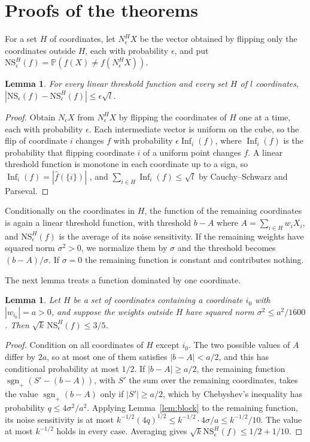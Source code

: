 \documentclass[11pt]{amsart}
\newtheorem{lemma}[theorem]{Lemma}
\theoremstyle{remark}
\numberwithin{equation}{section}
\newcommand{\PP}{\mathbb{P}}
\newcommand{\sgnp}{\operatorname{sgn}_+}
\newcommand{\Inf}{\operatorname{Inf}}
\begin{document}
\section{Proofs of the theorems}\label{sec:proofs}

For a set $H$ of coordinates, let $N^H_\epsilon X$ be the vector obtained by flipping only the coordinates outside $H$, each with probability $\epsilon$, and put $\mathrm{NS}^H_\epsilon(f)=\PP(f(X)\ne f(N^H_\epsilon X))$.

\begin{lemma}\label{lem:freeze}
For every linear threshold function and every set $H$ of $l$ coordinates, $|\mathrm{NS}_\epsilon(f)-\mathrm{NS}^H_\epsilon(f)|\le\epsilon\sqrt l$.
\end{lemma}

\begin{proof}
Obtain $N_\epsilon X$ from $N^H_\epsilon X$ by flipping the coordinates of $H$ one at a time, each with probability $\epsilon$. Each intermediate vector is uniform on the cube, so the flip of coordinate $i$ changes $f$ with probability $\epsilon\Inf_i(f)$, where $\Inf_i(f)$ is the probability that flipping coordinate $i$ of a uniform point changes $f$. A linear threshold function is monotone in each coordinate up to a sign, so $\Inf_i(f)=|\hat f(\{i\})|$ \cite[Chapter~2]{OD14}, and $\sum_{i\in H}\Inf_i(f)\le\sqrt l$ by Cauchy--Schwarz and Parseval.
\end{proof}

Conditionally on the coordinates in $H$, the function of the remaining coordinates is again a linear threshold function, with threshold $b-A$ where $A=\sum_{i\in H}w_iX_i$, and $\mathrm{NS}^H_\epsilon(f)$ is the average of its noise sensitivity. If the remaining weights have squared norm $\sigma^2>0$, we normalize them by $\sigma$ and the threshold becomes $(b-A)/\sigma$. If $\sigma=0$ the remaining function is constant and contributes nothing.

The next lemma treats a function dominated by one coordinate.

\begin{lemma}\label{lem:dominated}
Let $H$ be a set of coordinates containing a coordinate $i_0$ with $|w_{i_0}|=a>0$, and suppose the weights outside $H$ have squared norm $\sigma^2\le a^2/1600$. Then $\sqrt k\,\mathrm{NS}^H_\epsilon(f)\le3/5$.
\end{lemma}

\begin{proof}
Condition on all coordinates of $H$ except $i_0$. The two possible values of $A$ differ by $2a$, so at most one of them satisfies $|b-A|<a/2$, and this has conditional probability at most $1/2$. If $|b-A|\ge a/2$, the remaining function $\sgnp(S'-(b-A))$, with $S'$ the sum over the remaining coordinates, takes the value $\sgnp(b-A)$ only if $|S'|\ge a/2$, which by Chebyshev's inequality has probability $q\le4\sigma^2/a^2$. Applying Lemma~\ref{lem:block} to the remaining function, its noise sensitivity is at most $k^{-1/2}(4q)^{1/2}\le k^{-1/2}\cdot4\sigma/a\le k^{-1/2}/10$. The value at most $k^{-1/2}$ holds in every case. Averaging gives $\sqrt k\mathrm{NS}^H_\epsilon(f)\le1/2+1/10$.
\end{proof}
\end{document}

